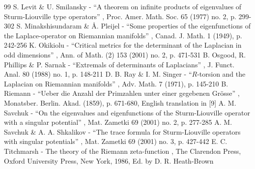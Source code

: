 \begin{thebibliography}{99}
 S. Levit \& U. Smilansky - “A theorem on infinite products of eigenvalues of Sturm-Liouville type operators” , Proc. Amer. Math. Soc. 65 (1977) no. 2, p. 299-302
 S. Minakshisundaram \& Å. Pleijel - “Some properties of the eigenfunctions of the Laplace-operator on Riemannian manifolds” , Canad. J. Math. 1 (1949), p. 242-256
 K. Okikiolu - “Critical metrics for the determinant of the Laplacian in odd dimensions” , Ann. of Math. (2) 153 (2001) no. 2, p. 471-531
 B. Osgood, R. Phillips \& P. Sarnak - “Extremals of determinants of Laplacians” , J. Funct. Anal. 80 (1988) no. 1, p. 148-211
 D. B. Ray \& I. M. Singer - “$R$-torsion and the Laplacian on Riemannian manifolds” , Adv. Math. 7 (1971), p. 145-210
 B. Riemann - “Ueber die Anzahl der Primzahlen unter einer gegebenen Grösse” , Monatsber. Berlin. Akad. (1859), p. 671-680, English translation in [9]
 A. M. Savchuk - “On the eigenvalues and eigenfunctions of the Sturm-Liouville operator with a singular potential” , Mat. Zametki 69 (2001) no. 2, p. 277-285
 A. M. Savchuk \& A. A. Shkalikov - “The trace formula for Sturm-Liouville operators with singular potentials” , Mat. Zametki 69 (2001) no. 3, p. 427-442
 E. C. Titchmarsh - The theory of the Riemann zeta-function , The Clarendon Press, Oxford University Press, New York, 1986, Ed. by D. R. Heath-Brown
\end{thebibliography}
